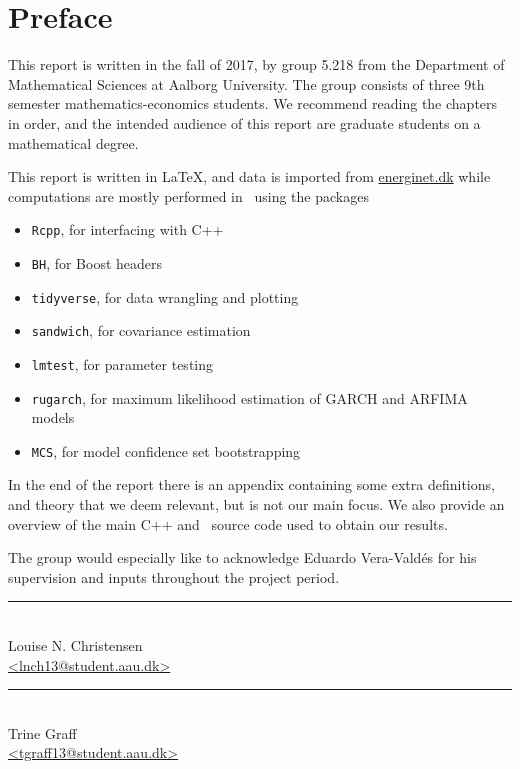 \chapter{Preface} \label{ch:preface}
This report is written in the fall of 2017, by group 5.218 from the Department of Mathematical Sciences at Aalborg University. The group consists of three 9th semester mathematics-economics students. 
We recommend reading the chapters in order, and the intended audience of this report are graduate students on a mathematical degree.

This report is written in \LaTeX, and data is imported from \url{energinet.dk} while computations are mostly performed in \Rlang ~using the packages

\begin{itemize}
	\item \texttt{Rcpp}, for interfacing with C++
	\item \texttt{BH}, for Boost headers
	\item \texttt{tidyverse}, for data wrangling and plotting
	\item \texttt{sandwich}, for covariance estimation
	\item \texttt{lmtest}, for parameter testing
	\item \texttt{rugarch}, for maximum likelihood estimation of GARCH and ARFIMA models
	\item \texttt{MCS}, for model confidence set bootstrapping
\end{itemize}

In the end of the report there is an appendix containing some extra definitions, and theory that we deem relevant, but is not our main focus.
We also provide an overview of the main C++ and \Rlang ~source code used to obtain our results.

The group would especially like to acknowledge Eduardo Vera-Valdés for his supervision and inputs throughout the project period. 


%
%
\vfill
%

\begin{center}
\begin{minipage}[b]{0.45\textwidth}
 \centering
 \rule{\textwidth}{0.5pt}\\
  Louise N. Christensen\\
 {\footnotesize\ttfamily \href{mailto:lnch13@student.aau.dk}{<lnch13@student.aau.dk>}}
\end{minipage}
\hfill
\begin{minipage}[b]{0.45\textwidth}
 \centering
 \rule{\textwidth}{0.5pt}\\
  Trine Graff\\
 {\footnotesize\ttfamily \href{mailto:tgraff13@student.aau.dk}{<tgraff13@student.aau.dk>}}
\end{minipage}
\end{center}

